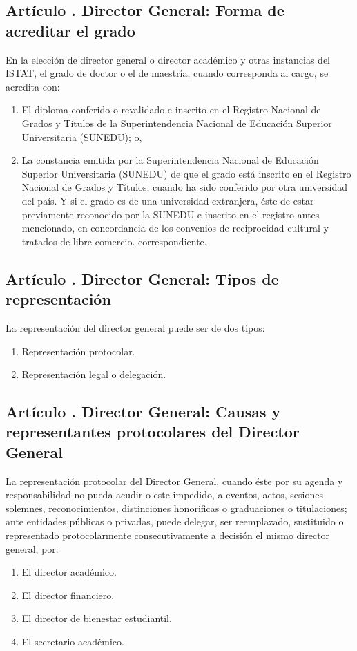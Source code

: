 \subsection{Artículo . Director General: Forma de acreditar el grado}
\addtocounter{ns}{1}
En la elección de director general o director académico y otras instancias del ISTAT, el grado de doctor o el de maestría, cuando corresponda al cargo, se acredita con:  
\begin{enumerate}
\item El diploma conferido o revalidado e inscrito en el Registro Nacional de Grados y Títulos de la Superintendencia Nacional de Educación Superior Universitaria (SUNEDU); o,  
\item La constancia emitida por la Superintendencia Nacional de Educación Superior Universitaria (SUNEDU) de que el grado está inscrito en el Registro Nacional de Grados y Títulos, cuando ha sido conferido por otra universidad del país. Y si el grado es de una universidad extranjera, éste de estar previamente reconocido por la SUNEDU e inscrito en el registro antes mencionado, en concordancia de los convenios de reciprocidad cultural y tratados de libre comercio. correspondiente. 
\end{enumerate}
\subsection{Artículo . Director General: Tipos de representación}
\addtocounter{ns}{1}
La representación del director general puede ser de dos tipos: 
\begin{enumerate}
\item Representación protocolar. 
\item Representación legal o delegación. 
\end{enumerate}
\subsection{Artículo . Director General: Causas y representantes protocolares del Director General}
\addtocounter{ns}{1}
La representación protocolar del Director General, cuando éste por su agenda y responsabilidad no pueda acudir o este impedido, a eventos, actos, sesiones solemnes, reconocimientos, distinciones honorificas o graduaciones o titulaciones; ante entidades públicas o privadas, puede delegar, ser reemplazado, sustituido o representado protocolarmente consecutivamente a decisión el mismo director general, por:  
\begin{enumerate}
\item El director académico.   
\item El director financiero. 
\item El director de bienestar estudiantil. 
\item El secretario académico. 
\end{enumerate}
